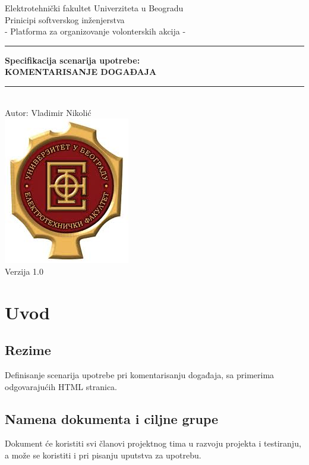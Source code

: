 \documentclass[11pt,a4paper]{article}
\begin{document}
\begin{titlepage}

\centering
\textnormal{\large Elektrotehnički fakultet Univerziteta u Beogradu}\\[0.1cm]
\textnormal{\large Prinicipi softverskog inženjerstva}\\[3cm]

\textnormal{\normalsize - Platforma za organizovanje volonterskih akcija -}\\\vspace{-5mm}
\rule{\textwidth}{0.4pt}
{\huge \bfseries Specifikacija scenarija upotrebe:\\ 
KOMENTARISANJE DOGAĐAJA\par}\vspace{-1mm}
\rule{\textwidth}{0.4pt}\\\vspace{1mm}
\textnormal{\large Autor: Vladimir Nikolić}\\[6cm]

\includegraphics[scale=0.5]{logo.jpg}\\
\vfill
\textnormal{\normalsize Verzija 1.0}\\

\end{titlepage}

\tableofcontents

\newpage

\section{Uvod}
\subsection{Rezime}
Definisanje scenarija upotrebe pri komentarisanju događaja, sa primerima odgovarajućih HTML stranica.
\subsection{Namena dokumenta i ciljne grupe}
Dokument će koristiti svi članovi projektnog tima u razvoju projekta i testiranju, a može se koristiti i pri pisanju uputstva za upotrebu.
\end{document}
